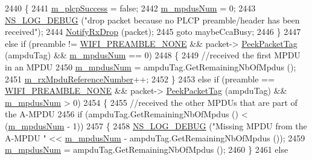 \begin{DoxyCode}
2440             \{
2441               \hyperlink{classns3_1_1WifiPhy_ad9a571bc52ef6cd8e63cff3dc14a718e}{m\_plcpSuccess} = \textcolor{keyword}{false};
2442               \hyperlink{classns3_1_1WifiPhy_aea15140c77315a8bf71eff068ea6570e}{m\_mpdusNum} = 0;
2443               \hyperlink{group__logging_ga413f1886406d49f59a6a0a89b77b4d0a}{NS\_LOG\_DEBUG} (\textcolor{stringliteral}{"drop packet because no PLCP preamble/header has been received"});
2444               \hyperlink{classns3_1_1WifiPhy_a72138f22fada63f61f2026b86aa5abd2}{NotifyRxDrop} (packet);
2445               \textcolor{keywordflow}{goto} maybeCcaBusy;
2446             \}
2447           \textcolor{keywordflow}{else} \textcolor{keywordflow}{if} (preamble != \hyperlink{group__wifi_gga5e94a56cb338a14ffbbb19c6a41251eba97c5c71995de5f28931200e6d5a38a66}{WIFI\_PREAMBLE\_NONE} && packet->
      \hyperlink{classns3_1_1Packet_a1734de11f2ca1e78a7872461a0625168}{PeekPacketTag} (ampduTag) && \hyperlink{classns3_1_1WifiPhy_aea15140c77315a8bf71eff068ea6570e}{m\_mpdusNum} == 0)
2448             \{
2449               \textcolor{comment}{//received the first MPDU in an MPDU}
2450               \hyperlink{classns3_1_1WifiPhy_aea15140c77315a8bf71eff068ea6570e}{m\_mpdusNum} = ampduTag.GetRemainingNbOfMpdus ();
2451               \hyperlink{classns3_1_1WifiPhy_ac4d2a0ac103e58c27743527d8289cc53}{m\_rxMpduReferenceNumber}++;
2452             \}
2453           \textcolor{keywordflow}{else} \textcolor{keywordflow}{if} (preamble == \hyperlink{group__wifi_gga5e94a56cb338a14ffbbb19c6a41251eba97c5c71995de5f28931200e6d5a38a66}{WIFI\_PREAMBLE\_NONE} && packet->
      \hyperlink{classns3_1_1Packet_a1734de11f2ca1e78a7872461a0625168}{PeekPacketTag} (ampduTag) && \hyperlink{classns3_1_1WifiPhy_aea15140c77315a8bf71eff068ea6570e}{m\_mpdusNum} > 0)
2454             \{
2455               \textcolor{comment}{//received the other MPDUs that are part of the A-MPDU}
2456               \textcolor{keywordflow}{if} (ampduTag.GetRemainingNbOfMpdus () < (\hyperlink{classns3_1_1WifiPhy_aea15140c77315a8bf71eff068ea6570e}{m\_mpdusNum} - 1))
2457                 \{
2458                   \hyperlink{group__logging_ga413f1886406d49f59a6a0a89b77b4d0a}{NS\_LOG\_DEBUG} (\textcolor{stringliteral}{"Missing MPDU from the A-MPDU "} << 
      \hyperlink{classns3_1_1WifiPhy_aea15140c77315a8bf71eff068ea6570e}{m\_mpdusNum} - ampduTag.GetRemainingNbOfMpdus ());
2459                   \hyperlink{classns3_1_1WifiPhy_aea15140c77315a8bf71eff068ea6570e}{m\_mpdusNum} = ampduTag.GetRemainingNbOfMpdus ();
2460                 \}
2461               \textcolor{keywordflow}{else}

\end{DoxyCode}
